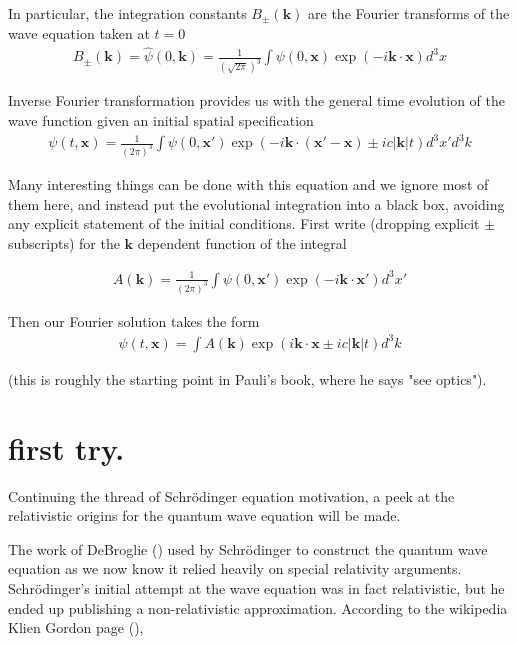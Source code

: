 \documentclass[]{eliblog}
\newcommand{\Abs}[1]{{\left\lvert{#1}\right\rvert}}
\newcommand{\Bk}[0]{\mathbf{k}}
\newcommand{\Bx}[0]{\mathbf{x}}
\newcommand{\inv}[1]{\frac{1}{#1}}
\begin{document}
In particular, the integration constants $B_{\pm}(\Bk)$ are the Fourier transforms of the wave equation taken at $t=0$
\begin{align}
B_{\pm}(\Bk) = \hat{\psi}(0,\Bk) = \inv{(\sqrt{2\pi})^3} \int \psi(0,\Bx) \exp\left( -i \Bk \cdot \Bx \right) d^3 x 
\end{align}

Inverse Fourier transformation provides us with the general time evolution of the wave function given an initial spatial 
specification
\begin{align}
{\psi}(t,\Bx) 
= \inv{({2\pi})^3} \int \psi(0,\Bx') \exp\left( -i \Bk \cdot (\Bx' -\Bx) \pm i c \Abs{\Bk} t \right) d^3 x' d^3 k
\end{align}

Many interesting things can be done with this equation and we ignore most of them here, and instead put the evolutional integration
into a black box, avoiding any explicit statement of the initial conditions.  First write (dropping explicit $\pm$ subscripts) for the
$\Bk$ dependent function of the integral

\begin{align}
A(\Bk) = \inv{({2\pi})^3} \int \psi(0,\Bx') \exp\left( -i \Bk \cdot \Bx' \right) d^3 x'
\end{align}

Then our Fourier solution takes the form
\begin{align}
{\psi}(t,\Bx) = \int A(\Bk) \exp\left( i \Bk \cdot \Bx \pm i c \Abs{\Bk} t \right) d^3 k
\end{align}

(this is roughly the starting point in Pauli's book, where he says "see optics").

\section{first try.}
Continuing the thread of Schr\"{o}dinger equation motivation, a peek at the relativistic origins for the quantum wave equation will be made.

The work of DeBroglie (\cite{AFkracklauerDeBroglie}) used by Schr\"{o}dinger to construct the quantum wave equation as we now know it relied heavily on special relativity arguments.  
Schr\"{o}dinger's initial attempt at the wave equation was in fact relativistic, but he ended up publishing a non-relativistic 
approximation.
According to the wikipedia Klien Gordon page (\cite{wikiKG}), 
\end{document}
